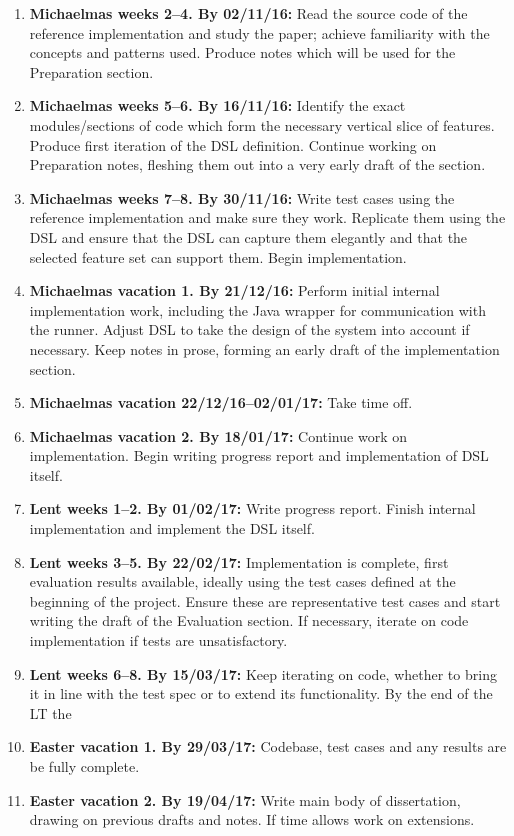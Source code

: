 \begin{enumerate}

\item \textbf{Michaelmas weeks 2--4. By 02/11/16:} Read the source code of the reference implementation and study the paper; achieve familiarity with the concepts and patterns used. Produce notes which will be used for the Preparation section.

\item \textbf{Michaelmas weeks 5--6. By 16/11/16:} Identify the exact modules/sections of code which form the necessary vertical slice of features. Produce first iteration of the DSL definition. Continue working on Preparation notes, fleshing them out into a very early draft of the section.

\item \textbf{Michaelmas weeks 7--8. By 30/11/16:} Write test cases using the reference implementation and make sure they work. Replicate them using the DSL and ensure that the DSL can capture them elegantly and that the selected feature set can support them. Begin implementation. 

\item \textbf{Michaelmas vacation 1. By 21/12/16:} Perform initial internal implementation work, including the Java wrapper for communication with the runner. Adjust DSL to take the design of the system into account if necessary. Keep notes in prose, forming an early draft of the implementation section.
\item \textbf{Michaelmas vacation 22/12/16--02/01/17:} Take time off.

\item \textbf{Michaelmas vacation 2. By 18/01/17:} Continue work on implementation. Begin writing progress report and implementation of DSL itself.

\item \textbf{Lent weeks 1--2. By 01/02/17:} Write progress report. Finish internal implementation and implement the DSL itself.

\item \textbf{Lent weeks 3--5. By 22/02/17:} Implementation is complete, first evaluation results available, ideally using the test cases defined at the beginning of the project. Ensure these are representative test cases and start writing the draft of the Evaluation section. If necessary, iterate on code implementation if tests are unsatisfactory.

\item \textbf{Lent weeks 6--8. By 15/03/17:} Keep iterating on code, whether to bring it in line with the test spec or to extend its functionality. By the end of the LT the 
\item \textbf{Easter vacation 1. By 29/03/17:} Codebase, test cases and any results are be fully complete.
\item \textbf{Easter vacation 2. By 19/04/17:} Write main body of dissertation, drawing on previous drafts and notes. If time allows work on extensions.


\end{enumerate}
